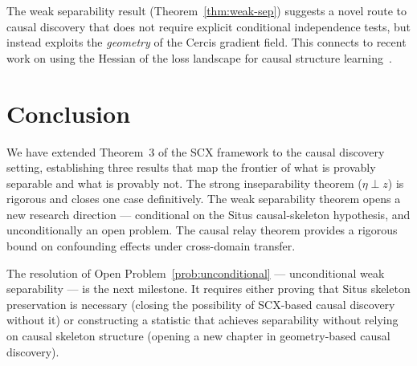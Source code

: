 \documentclass[12pt,a4paper]{article}
\begin{document}
The weak separability result (Theorem~\ref{thm:weak-sep}) suggests a novel
route to causal discovery that does not require explicit conditional
independence tests, but instead exploits the \emph{geometry} of the Cercis
gradient field.  This connects to recent work on using the Hessian of the loss
landscape for causal structure learning~\citep{wu2024hessian}.

\section{Conclusion}

We have extended Theorem~3 of the SCX framework to the causal discovery
setting, establishing three results that map the frontier of what is provably
separable and what is provably not.  The strong inseparability theorem
($\eta \perp z$) is rigorous and closes one case definitively.  The weak
separability theorem opens a new research direction — conditional on the Situs
causal-skeleton hypothesis, and unconditionally an open problem.  The causal
relay theorem provides a rigorous bound on confounding effects under
cross-domain transfer.

The resolution of Open Problem~\ref{prob:unconditional} — unconditional weak
separability — is the next milestone.  It requires either proving that Situs
skeleton preservation is necessary (closing the possibility of SCX-based causal
discovery without it) or constructing a statistic that achieves separability
without relying on causal skeleton structure (opening a new chapter in
geometry-based causal discovery).
\end{document}
